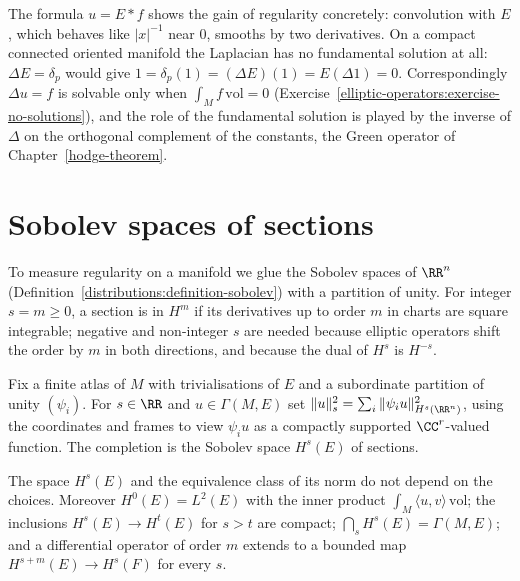 The formula $u = E * f$ shows the gain of regularity concretely: convolution with $E$, which behaves like $|x|^{-1}$ near $0$, smooths by two derivatives. On a compact connected oriented manifold the
Laplacian has no fundamental solution at all: $\Delta E = \delta_p$ would give $1 = \delta_p(1) = (\Delta E)(1) = E(\Delta1) = 0$. Correspondingly $\Delta u = f$ is solvable only when $\int_Mf\,\mathrm{vol} = 0$
(Exercise~\ref{elliptic-operators:exercise-no-solutions}), and the role of the fundamental solution is played by the inverse of $\Delta$ on the orthogonal complement of the constants, the Green
operator of Chapter~\ref{hodge-theorem}.

\section{Sobolev spaces of sections}\label{elliptic-operators:section-sobolev-sections}

To measure regularity on a manifold we glue the Sobolev spaces of $\RR^n$ (Definition~\ref{distributions:definition-sobolev}) with a partition of unity. For integer $s = m \geq 0$, a section is in $H^m$
if its derivatives up to order $m$ in charts are square integrable; negative and non-integer $s$ are needed because elliptic operators shift the order by $m$ in both directions, and because the
dual of $H^s$ is $H^{-s}$.

\begin{definition}\label{elliptic-operators:definition-sobolev-sections}
Fix a finite atlas of $M$ with trivialisations of $E$ and a subordinate partition of unity $(\psi_i)$. For $s \in \RR$ and $u \in \Gamma(M, E)$ set
$\|u\|_s^2 = \sum_i\|\psi_iu\|_{H^s(\RR^n)}^2$, using the coordinates and frames to view $\psi_iu$ as a compactly supported $\CC^r$-valued function. The completion is the Sobolev space $H^s(E)$ of sections.
\end{definition}

\begin{proposition}\label{elliptic-operators:proposition-sobolev-sections}
The space $H^s(E)$ and the equivalence class of its norm do not depend on the choices. Moreover $H^0(E) = L^2(E)$ with the inner product $\int_M\langle u, v\rangle\,\mathrm{vol}$; the inclusions
$H^s(E) \to H^t(E)$ for $s > t$ are compact; $\bigcap_sH^s(E) = \Gamma(M, E)$; and a differential operator of order $m$ extends to a bounded map $H^{s+m}(E) \to H^s(F)$ for every $s$.
\end{proposition}

